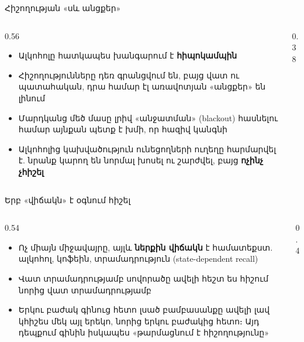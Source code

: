 \begin{frame}{Հիշողության «սև անցքեր»}
  \begin{columns}[c]
    \begin{column}{0.56\textwidth}
      \begin{itemize}
        \item Ալկոհոլը հատկապես խանգարում է \textbf{հիպոկամպին}
        \item Հիշողությունները դեռ գրանցվում են, բայց վատ ու պատահական, դրա համար էլ առավոտյան «անցքեր» են լինում
        \item<2-> Մարդկանց մեծ մասը լրիվ «անջատման» (blackout) հասնելու համար այնքան պետք է խմի, որ հազիվ կանգնի
        \item<3-> Ալկոհոլից կախվածություն ունեցողների ուղեղը հարմարվել է. նրանք կարող են նորմալ խոսել ու շարժվել, բայց \textbf{ոչինչ չհիշել}
      \end{itemize}
    \end{column}
    \begin{column}{0.38\textwidth}
    \end{column}
  \end{columns}
\end{frame}

\begin{frame}{Երբ «վիճակն» է օգնում հիշել}
  \begin{columns}[T]
    \begin{column}{0.54\textwidth}
      \begin{itemize}
        \item Ոչ միայն միջավայրը, այլև \textbf{ներքին վիճակն} է համատեքստ. ալկոհոլ, կոֆեին, տրամադրություն (state-dependent recall)
        \item<2-> Վատ տրամադրությամբ սովորածը ավելի հեշտ ես հիշում նորից վատ տրամադրությամբ
        \item<3-> Երկու բաժակ գինուց հետո լսած բամբասանքը ավելի լավ կհիշես մեկ այլ երեկո, նորից երկու բաժակից հետո։ Այդ դեպքում գինին իսկապես «թարմացնում է հիշողությունը»
      \end{itemize}
    \end{column}
    \begin{column}{0.4\textwidth}
    \end{column}
  \end{columns}
\end{frame}

